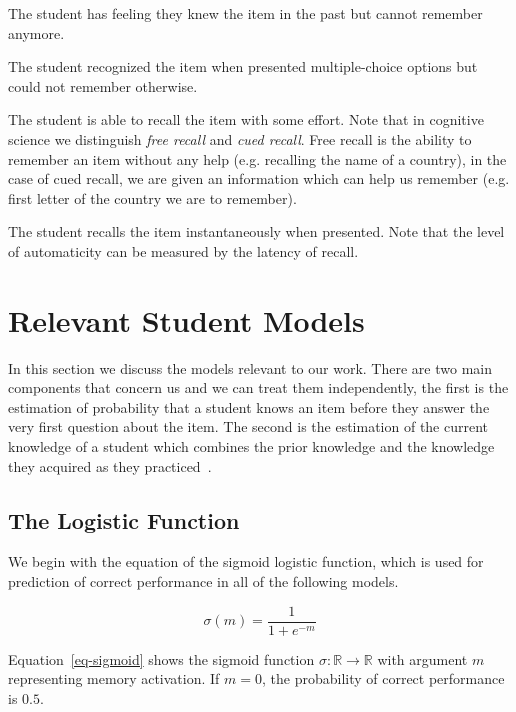 \begin{description}[leftmargin=0cm]
  \item[Familiarity] The student has feeling they knew the item in the past but cannot remember anymore.
  \item[Recognition] The student recognized the item when presented multiple-choice options but could not remember otherwise.
  \item[Recall] The student is able to recall the item with some effort. Note that in cognitive science we distinguish \textit{free recall} and \textit{cued recall}. Free recall is the ability to remember an item without any help (e.g. recalling the name of a country), in the case of cued recall, we are given an information which can help us remember (e.g. first letter of the country we are to remember).
  \item[Automaticity] The student recalls the item instantaneously when presented. Note that the level of automaticity can be measured by the latency of recall.
\end{description}

\section{Relevant Student Models}
\label{relevant-models}

In this section we discuss the models relevant to our work. There are two main components that concern us and we can treat them independently, the first is the estimation of probability that a student knows an item before they answer the very first question about the item. The second is the estimation of the current knowledge of a student which combines the prior knowledge and the knowledge they acquired as they practiced~\cite{Papousek2014}.

\subsection{The Logistic Function}

We begin with the equation of the sigmoid logistic function, which is used for prediction of correct performance in all of the following models.

\begin{equation} \label{eq-sigmoid}
  \sigma(m) = \frac{1}{1 + e^{-m}}
\end{equation}

Equation~\ref{eq-sigmoid} shows the sigmoid function $\sigma : \mathbb{R} \rightarrow \mathbb{R}$ with argument $m$ representing memory activation. If $m = 0$, the probability of correct performance is $0.5$.

